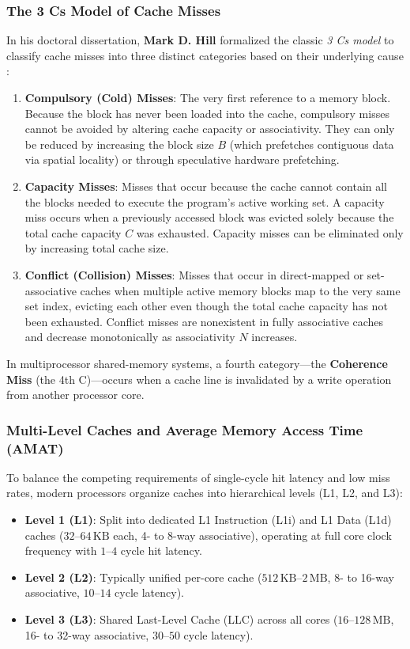 \subsubsection{The 3 Cs Model of Cache Misses}

In his doctoral dissertation, \textbf{Mark D. Hill} formalized the classic \textit{3 Cs model} to classify cache misses into three distinct categories based on their underlying cause \cite{hill1987aspects}:
\begin{enumerate}
    \item \textbf{Compulsory (Cold) Misses}: The very first reference to a memory block. Because the block has never been loaded into the cache, compulsory misses cannot be avoided by altering cache capacity or associativity. They can only be reduced by increasing the block size $B$ (which prefetches contiguous data via spatial locality) or through speculative hardware prefetching.
    \item \textbf{Capacity Misses}: Misses that occur because the cache cannot contain all the blocks needed to execute the program's active working set. A capacity miss occurs when a previously accessed block was evicted solely because the total cache capacity $C$ was exhausted. Capacity misses can be eliminated only by increasing total cache size.
    \item \textbf{Conflict (Collision) Misses}: Misses that occur in direct-mapped or set-associative caches when multiple active memory blocks map to the very same set index, evicting each other even though the total cache capacity has not been exhausted. Conflict misses are nonexistent in fully associative caches and decrease monotonically as associativity $N$ increases.
\end{enumerate}
In multiprocessor shared-memory systems, a fourth category---the \textbf{Coherence Miss} (the 4th C)---occurs when a cache line is invalidated by a write operation from another processor core.

\subsubsection{Multi-Level Caches and Average Memory Access Time (AMAT)}
To balance the competing requirements of single-cycle hit latency and low miss rates, modern processors organize caches into hierarchical levels (L1, L2, and L3):
\begin{itemize}
    \item \textbf{Level 1 (L1)}: Split into dedicated L1 Instruction (L1i) and L1 Data (L1d) caches ($32\text{--}64\,\text{KB}$ each, 4- to 8-way associative), operating at full core clock frequency with $1\text{--}4$ cycle hit latency.
    \item \textbf{Level 2 (L2)}: Typically unified per-core cache ($512\,\text{KB}\text{--}2\,\text{MB}$, 8- to 16-way associative, $10\text{--}14$ cycle latency).
    \item \textbf{Level 3 (L3)}: Shared Last-Level Cache (LLC) across all cores ($16\text{--}128\,\text{MB}$, 16- to 32-way associative, $30\text{--}50$ cycle latency).
\end{itemize}

